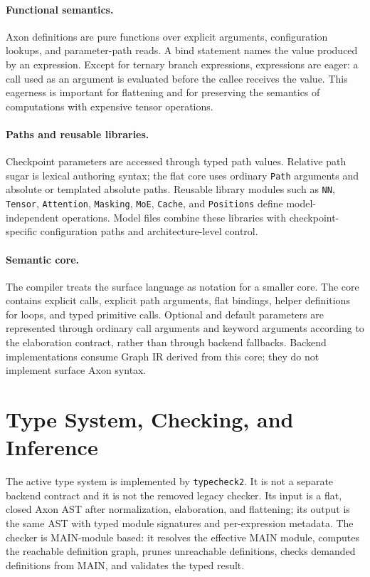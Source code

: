 \documentclass{article}
\newcommand{\code}[1]{\texttt{#1}}
\begin{document}
\paragraph{Functional semantics.}
Axon definitions are pure functions over explicit arguments, configuration
lookups, and parameter-path reads.  A bind statement names the value produced
by an expression.  Except for ternary branch expressions, expressions are
eager: a call used as an argument is evaluated before the callee receives the
value.  This eagerness is important for flattening and for preserving the
semantics of computations with expensive tensor operations.

\paragraph{Paths and reusable libraries.}
Checkpoint parameters are accessed through typed path values.  Relative path
sugar is lexical authoring syntax; the flat core uses ordinary \code{Path}
arguments and absolute or templated absolute paths.  Reusable library modules
such as \code{NN}, \code{Tensor}, \code{Attention}, \code{Masking}, \code{MoE},
\code{Cache}, and \code{Positions} define model-independent operations.  Model
files combine these libraries with checkpoint-specific configuration paths and
architecture-level control.

\paragraph{Semantic core.}
The compiler treats the surface language as notation for a smaller core.  The
core contains explicit calls, explicit path arguments, flat bindings, helper
definitions for loops, and typed primitive calls.  Optional and default
parameters are represented through ordinary call arguments and keyword
arguments according to the elaboration contract, rather than through backend
fallbacks.  Backend implementations consume Graph IR derived from this core;
they do not implement surface Axon syntax.

\section{Type System, Checking, and Inference}

The active type system is implemented by \code{typecheck2}.  It is not a
separate backend contract and it is not the removed legacy checker.  Its input
is a flat, closed Axon AST after normalization, elaboration, and flattening;
its output is the same AST with typed module signatures and per-expression
metadata.  The checker is MAIN-module based: it resolves the effective MAIN
module, computes the reachable definition graph, prunes unreachable
definitions, checks demanded definitions from MAIN, and validates the typed
result.
\end{document}
